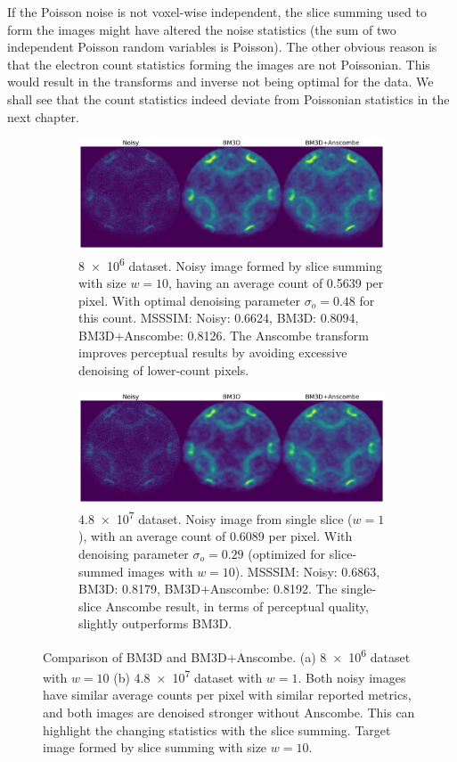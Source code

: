 If the Poisson noise is not voxel-wise independent, the slice summing used to form the images might have altered the noise statistics (the sum of two independent Poisson random variables is Poisson). The other obvious reason is that the electron count statistics forming the images are not Poissonian. This would result in the transforms and inverse not being optimal for the data. We shall see that the count statistics indeed deviate from Poissonian statistics in the next chapter.


\begin{figure}
    \centering
    \begin{subfigure}[b]{1\linewidth}
        \centering
        \includegraphics[width=1\linewidth]{images/noisy_denoised_bm3d_anscombe_8M_10slices_optimal_sigma.pdf}
        \caption{\num{8e6} dataset. Noisy image formed by slice summing with size $w=10$, having an average count of \num{0.5639} per pixel. With optimal denoising parameter $\sigma_o = 0.48$ for this count. \gls{MSSSIM}: Noisy: 0.6624, BM3D: 0.8094, BM3D+Anscombe: 0.8126. The Anscombe transform improves perceptual results by avoiding excessive denoising of lower-count pixels.}
    \end{subfigure}
    \begin{subfigure}[b]{1\linewidth}
        \centering
        \includegraphics[width=1\linewidth]{images/noisy_denoised_bm3d_anscombe_48M_single_slice_sigma_1.pdf}
        \caption{\num{4.8e7} dataset. Noisy image from single slice ($w=1$), with an average count of \num{0.6089} per pixel. With denoising parameter $\sigma_o = 0.29$ (optimized for slice-summed images with $w = 10$). \gls{MSSSIM}: Noisy: 0.6863, BM3D: 0.8179, BM3D+Anscombe: 0.8192. The single-slice Anscombe result, in terms of perceptual quality, slightly outperforms BM3D.}
        \label{}
    \end{subfigure}
    \caption{Comparison of BM3D and BM3D+Anscombe. (a) \num{8e6} dataset with $w=10$ (b) \num{4.8e7} dataset with $w=1$. Both noisy images have similar average counts per pixel with similar reported metrics, and both images are denoised stronger without Anscombe. This can highlight the changing statistics with the slice summing.
     Target image formed by slice summing with size $w=10$.}
    \label{}
\end{figure}



